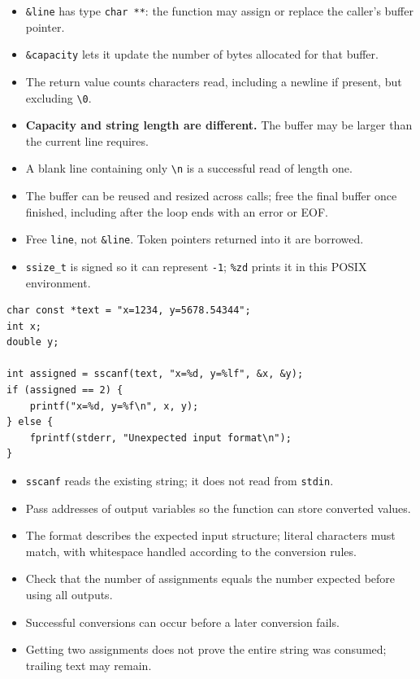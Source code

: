 \documentclass[11pt,a4paper]{article}
\providecommand{\tightlist}{\setlength{\itemsep}{0pt}\setlength{\parskip}{0pt}}
\begin{document}
\begin{itemize}
\tightlist
\item
  \texttt{\&line} has type \texttt{char\ **}: the function may assign or replace the caller's buffer pointer.
\item
  \texttt{\&capacity} lets it update the number of bytes allocated for that buffer.
\item
  The return value counts characters read, including a newline if present, but excluding \texttt{\textquotesingle{}\textbackslash{}0\textquotesingle{}}.
\item
  \textbf{Capacity and string length are different.} The buffer may be larger than the current line requires.
\item
  A blank line containing only \texttt{\textquotesingle{}\textbackslash{}n\textquotesingle{}} is a successful read of length one.
\item
  The buffer can be reused and resized across calls; free the final buffer once finished, including after the loop ends with an error or EOF.
\item
  Free \texttt{line}, not \texttt{\&line}. Token pointers returned into it are borrowed.
\item
  \texttt{ssize\_t} is signed so it can represent \texttt{-1}; \texttt{\%zd} prints it in this POSIX environment.
\end{itemize}

\label{sscanf-converting-a-string-into-values}
\hypertarget{sscanf-converting-a-string-into-values}{}

\begin{lstlisting}[style=cscode]
char const *text = "x=1234, y=5678.54344";
int x;
double y;

int assigned = sscanf(text, "x=%d, y=%lf", &x, &y);
if (assigned == 2) {
    printf("x=%d, y=%f\n", x, y);
} else {
    fprintf(stderr, "Unexpected input format\n");
}
\end{lstlisting}

\begin{itemize}
\tightlist
\item
  \texttt{sscanf} reads the existing string; it does not read from \texttt{stdin}.
\item
  Pass addresses of output variables so the function can store converted values.
\item
  The format describes the expected input structure; literal characters must match, with whitespace handled according to the conversion rules.
\item
  Check that the number of assignments equals the number expected before using all outputs.
\item
  Successful conversions can occur before a later conversion fails.
\item
  Getting two assignments does not prove the entire string was consumed; trailing text may remain.
\end{itemize}
\end{document}
